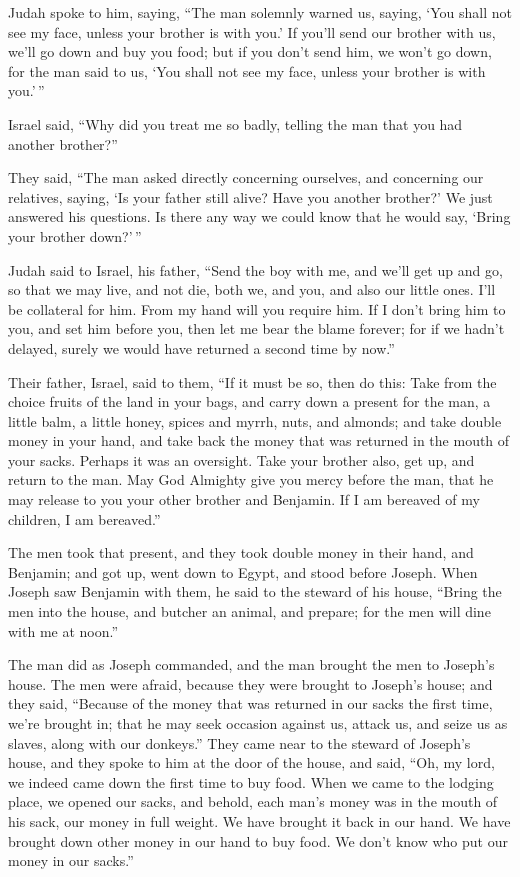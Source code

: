  Judah spoke to him, saying, ``The man solemnly warned us,
saying, `You shall not see my face, unless your brother is with you.'
 If you'll send our brother with us, we'll go down and buy
you food;  but if you don't send him, we won't go down,
for the man said to us, `You shall not see my face, unless your brother
is with you.'\,''

 Israel said, ``Why did you treat me so badly, telling the
man that you had another brother?''

 They said, ``The man asked directly concerning ourselves,
and concerning our relatives, saying, `Is your father still alive? Have
you another brother?' We just answered his questions. Is there any way
we could know that he would say, `Bring your brother down?'\,''

 Judah said to Israel, his father, ``Send the boy with me,
and we'll get up and go, so that we may live, and not die, both we, and
you, and also our little ones.  I'll be collateral for
him. From my hand will you require him. If I don't bring him to you, and
set him before you, then let me bear the blame forever; 
for if we hadn't delayed, surely we would have returned a second time by
now.''

 Their father, Israel, said to them, ``If it must be so,
then do this: Take from the choice fruits of the land in your bags, and
carry down a present for the man, a little balm, a little honey, spices
and myrrh, nuts, and almonds;  and take double money in
your hand, and take back the money that was returned in the mouth of
your sacks. Perhaps it was an oversight.  Take your
brother also, get up, and return to the man.  May God
Almighty give you mercy before the man, that he may release to you your
other brother and Benjamin. If I am bereaved of my children, I am
bereaved.''

 The men took that present, and they took double money in
their hand, and Benjamin; and got up, went down to Egypt, and stood
before Joseph.  When Joseph saw Benjamin with them, he
said to the steward of his house, ``Bring the men into the house, and
butcher an animal, and prepare; for the men will dine with me at noon.''

 The man did as Joseph commanded, and the man brought the
men to Joseph's house.  The men were afraid, because they
were brought to Joseph's house; and they said, ``Because of the money
that was returned in our sacks the first time, we're brought in; that he
may seek occasion against us, attack us, and seize us as slaves, along
with our donkeys.''  They came near to the steward of
Joseph's house, and they spoke to him at the door of the house,
 and said, ``Oh, my lord, we indeed came down the first
time to buy food.  When we came to the lodging place, we
opened our sacks, and behold, each man's money was in the mouth of his
sack, our money in full weight. We have brought it back in our hand.
 We have brought down other money in our hand to buy
food. We don't know who put our money in our sacks.''

